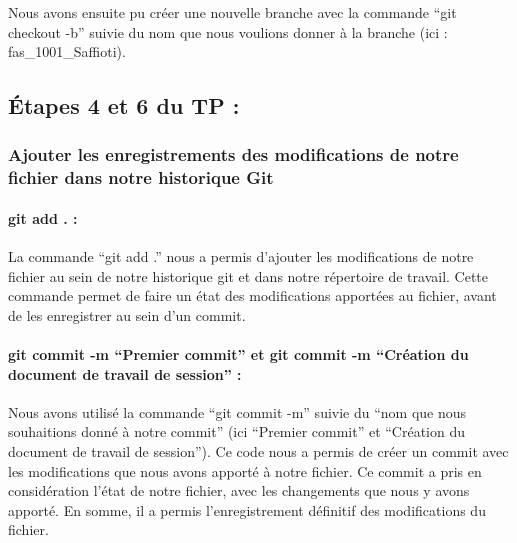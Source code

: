 \documentclass[
  letterpaper,
  DIV=11,
  numbers=noendperiod]{scrartcl}
\let\oldparagraph\paragraph
\renewcommand{\paragraph}[1]{\oldparagraph{#1}\mbox{}}
\begin{document}
Nous avons ensuite pu créer une nouvelle branche avec la commande ``git
checkout -b'' suivie du nom que nous voulions donner à la branche (ici :
fas\_1001\_Saffioti).

\hypertarget{uxe9tapes-4-et-6-du-tp}{%
\subsection{Étapes 4 et 6 du TP :}\label{uxe9tapes-4-et-6-du-tp}}

\hypertarget{ajouter-les-enregistrements-des-modifications-de-notre-fichier-dans-notre-historique-git}{%
\subsubsection{Ajouter les enregistrements des modifications de notre
fichier dans notre historique
Git}\label{ajouter-les-enregistrements-des-modifications-de-notre-fichier-dans-notre-historique-git}}

\hypertarget{git-add-.}{%
\paragraph{git add . :}\label{git-add-.}}

La commande ``git add .'' nous a permis d'ajouter les modifications de
notre fichier au sein de notre historique git et dans notre répertoire
de travail. Cette commande permet de faire un état des modifications
apportées au fichier, avant de les enregistrer au sein d'un commit.

\hypertarget{git-commit--m-premier-commit-et-git-commit--m-cruxe9ation-du-document-de-travail-de-session}{%
\paragraph{git commit -m ``Premier commit'' et git commit -m ``Création
du document de travail de session''
:}\label{git-commit--m-premier-commit-et-git-commit--m-cruxe9ation-du-document-de-travail-de-session}}

Nous avons utilisé la commande ``git commit -m'' suivie du ``nom que
nous souhaitions donné à notre commit'' (ici ``Premier commit'' et
``Création du document de travail de session''). Ce code nous a permis
de créer un commit avec les modifications que nous avons apporté à notre
fichier. Ce commit a pris en considération l'état de notre fichier, avec
les changements que nous y avons apporté. En somme, il a permis
l'enregistrement définitif des modifications du fichier.
\end{document}
